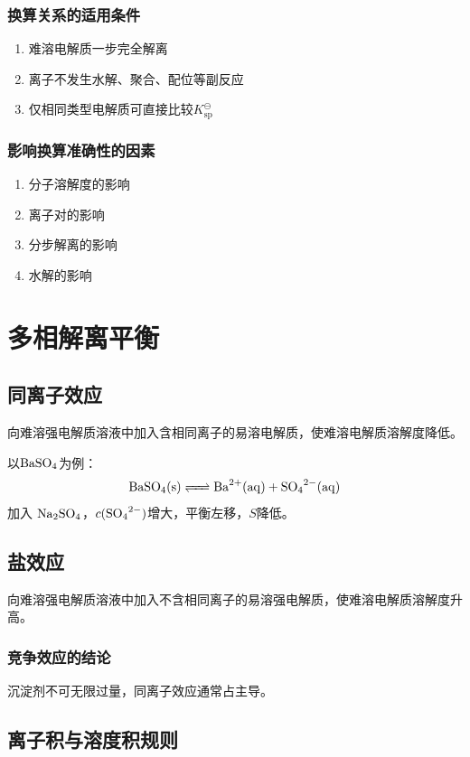 \subsubsection{换算关系的适用条件}
\begin{enumerate}
    \item 难溶电解质一步完全解离
    \item 离子不发生水解、聚合、配位等副反应
    \item 仅相同类型电解质可直接比较$K_{\text{sp}}^{\ominus}$
\end{enumerate}

\subsubsection{影响换算准确性的因素}
\begin{enumerate}
    \item 分子溶解度的影响
    \item 离子对的影响  
    \item 分步解离的影响
    \item 水解的影响
\end{enumerate}

\section{多相解离平衡}

\subsection{同离子效应}

向难溶强电解质溶液中加入含相同离子的易溶电解质，使难溶电解质溶解度降低。

以$\ce{BaSO4}$为例：
\[
\ce{BaSO4(s) <=> Ba^{2+}(aq) + SO4^{2-}(aq)}
\]
加入 \(\ce{Na2SO4}\)，$c(\ce{SO4^{2-}})$增大，平衡左移，$S$降低。

\subsection{盐效应}

向难溶强电解质溶液中加入不含相同离子的易溶强电解质，使难溶电解质溶解度升高。

\subsubsection{竞争效应的结论}
沉淀剂不可无限过量，同离子效应通常占主导。

\subsection{离子积与溶度积规则}

